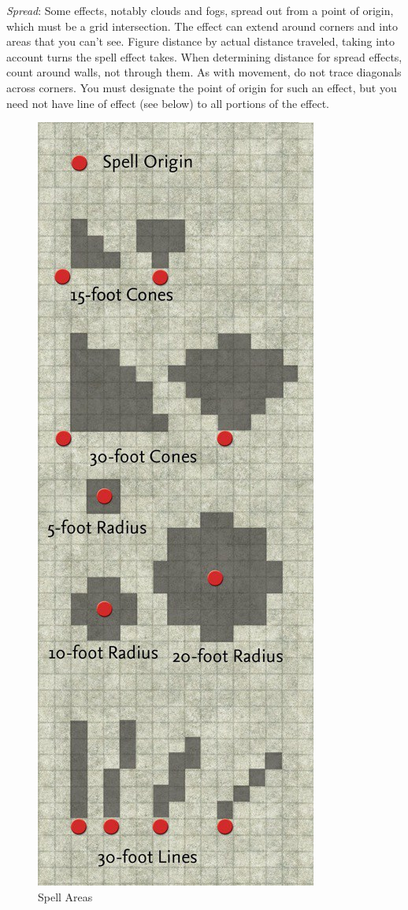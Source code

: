 \textit{Spread}: Some effects, notably clouds and fogs, spread out from a point of origin, which must be a grid intersection. The effect can extend around corners and into areas that you can't see. Figure distance by actual distance traveled, taking into account turns the spell effect takes. When determining distance for spread effects, count around walls, not through them. As with movement, do not trace diagonals across corners. You must designate the point of origin for such an effect, but you need not have line of effect (see below) to all portions of the effect.


\begin{figure}
 \sffamily
 \caption{Spell Areas}
 \includegraphics[width=\linewidth]{images/SpellAreas.jpg}

\end{figure}
